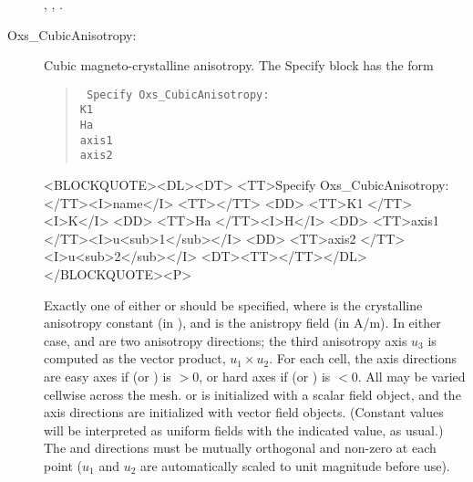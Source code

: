\begin{description}
\begin{ExampleMifs}
 , , .
\end{ExampleMifs}

%
\item[Oxs\_CubicAnisotropy:] Cubic magneto-crystalline anisotropy.
  The Specify block has the form
   \begin{latexonly}
      \begin{quote}\tt
      Specify Oxs\_CubicAnisotropy: \ocb\\
        \bi K1  \\
        \bi Ha  \\
        \bi axis1  \\
        \bi axis2  \\
      \ccb
      \end{quote}
   \end{latexonly}
   \begin{rawhtml}
   <BLOCKQUOTE><DL><DT>
   <TT>Specify Oxs_CubicAnisotropy:</TT><I>name</I> <TT>{</TT>
       <DD> <TT>K1 </TT><I>K</I>
       <DD> <TT>Ha </TT><I>H</I>
       <DD> <TT>axis1 </TT><I>u<sub>1</sub></I>
       <DD> <TT>axis2 </TT><I>u<sub>2</sub></I>
   <DT><TT>}</TT></DL></BLOCKQUOTE><P>
   \end{rawhtml}
  Exactly one of either  or  should be
  specified, where  is the crystalline anisotropy constant
  (in
  ),
  and  is the anistropy field (in A/m).  In either case,
   and  are two anisotropy directions;
  the third anisotropy axis $u_3$ is computed as the vector product,
  $u_1\times u_2$.  For each cell, the axis directions are easy axes if
   (or ) is $>$0, or hard axes if
   (or ) is $<$0.  All may be varied cellwise
  across the mesh.   or  is initialized with a
  scalar field object, and the axis directions are initialized with
  vector field objects.  (Constant values will be interpreted as uniform
  fields with the indicated value, as usual.)  The  and
   directions must be mutually orthogonal and non-zero
  at each point ($u_1$ and $u_2$ are automatically scaled to unit
  magnitude before use).


\end{description}
